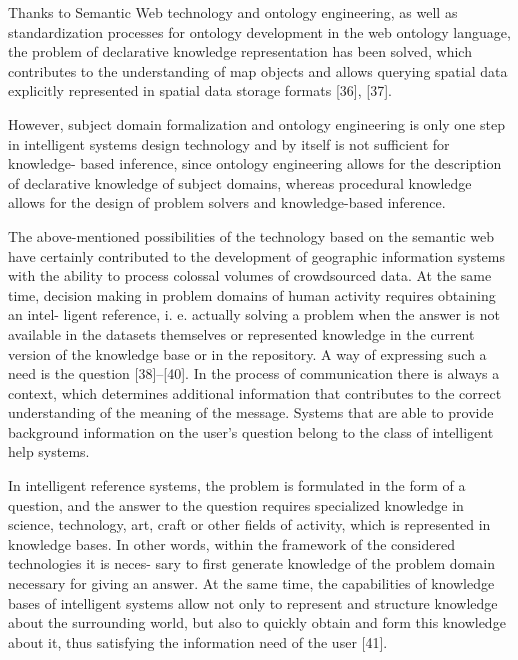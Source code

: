 \documentclass[10pt, letterpaper, twoside]{article}
\begin{document}
\begin{multicols}{2}
Thanks to Semantic Web technology and ontology
engineering, as well as standardization processes for
ontology development in the web ontology language,
the problem of declarative knowledge representation has
been solved, which contributes to the understanding of
map objects and allows querying spatial data explicitly
represented in spatial data storage formats [36], [37].

However, subject domain formalization and ontology
engineering is only one step in intelligent systems design
technology and by itself is not sufficient for knowledge-
based inference, since ontology engineering allows for
the description of declarative knowledge of subject domains, whereas procedural knowledge allows for the design of problem solvers and knowledge-based inference.

The above-mentioned possibilities of the technology
based on the semantic web have certainly contributed to
the development of geographic information systems with
the ability to process colossal volumes of crowdsourced
data. At the same time, decision making in problem
domains of human activity requires obtaining an intel-
ligent reference, i. e. actually solving a problem when
the answer is not available in the datasets themselves
or represented knowledge in the current version of the
knowledge base or in the repository. A way of expressing
such a need is the question [38]–[40]. In the process
of communication there is always a context, which determines additional information that contributes to the
correct understanding of the meaning of the message.
Systems that are able to provide background information
on the user’s question belong to the class of intelligent
help systems.

In intelligent reference systems, the problem is formulated in the form of a question, and the answer to
the question requires specialized knowledge in science,
technology, art, craft or other fields of activity, which is
represented in knowledge bases. In other words, within
the framework of the considered technologies it is neces-
sary to first generate knowledge of the problem domain
necessary for giving an answer. At the same time, the
capabilities of knowledge bases of intelligent systems
allow not only to represent and structure knowledge
about the surrounding world, but also to quickly obtain
and form this knowledge about it, thus satisfying the
information need of the user [41].


\end{multicols}
\end{document}
